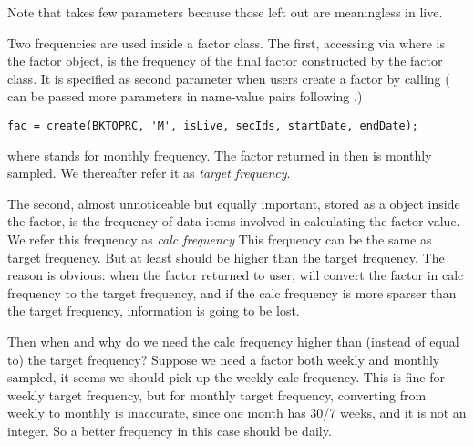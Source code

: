        Note that  takes few parameters 
       because those left out are meaningless in live.

\nopagebreak
{}

\begin{parchment}
       \small\sffamily
       Two frequencies are used inside a factor class. 
       The first, accessing via  where  is the factor object,
       is the frequency of the final factor constructed by the factor class.
       It is specified as second parameter when users create a factor by calling
       ( can be passed more parameters in name-value pairs following .)
\begin{lstlisting}[numbers=none]
  fac = create(BKTOPRC, 'M', isLive, secIds, startDate, endDate);
\end{lstlisting}
       where  stands for monthly frequency.
       The factor returned in  then is monthly sampled.
       We thereafter refer it as \emph{target frequency}.

       The second, almost unnoticeable but equally important, stored as
       a  object inside the factor,
       is the frequency of data items involved in calculating the factor value.
       We refer this frequency as \emph{calc frequency}
       This frequency can be the same as target frequency.
       But at least should be higher than the target frequency.
       The reason is obvious:
       when the factor returned to user, 
       will convert the factor in calc frequency to the target frequency,
       and if the calc frequency is more sparser than the target frequency,
       information is going to be lost.

       Then when and why do we need the calc frequency higher than (instead of equal to) the target frequency?
       Suppose we need a factor both weekly and monthly sampled,
       it seems we should pick up the weekly calc frequency.
       This is fine for weekly target frequency, 
       but for monthly target frequency,
       converting from weekly to monthly is inaccurate, 
       since one month has 30/7 weeks, 
       and it is not an integer.
       So a better frequency in this case should be daily.


\end{parchment}
